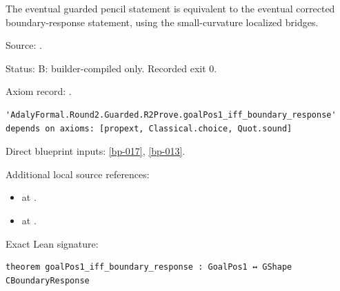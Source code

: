 \begin{theorem}[bp-020]
\label{bp-020}
\leanok
The eventual guarded pencil statement is equivalent to the eventual corrected boundary-response statement, using the small-curvature localized bridges.

\par Source: \texttt{}.
\par Status: B: builder-compiled only. Recorded exit 0.
\par Axiom record: \texttt{}.
\begin{verbatim}
'AdalyFormal.Round2.Guarded.R2Prove.goalPos1_iff_boundary_response' depends on axioms: [propext, Classical.choice, Quot.sound]
\end{verbatim}
\par Direct blueprint inputs: \ref{bp-017}, \ref{bp-013}.
\par Additional local source references:
\begin{itemize}
\item \texttt{} at \texttt{}.
\item \texttt{} at \texttt{}.
\end{itemize}
\par Exact Lean signature:
\begin{verbatim}
theorem goalPos1_iff_boundary_response : GoalPos1 ↔ GShape CBoundaryResponse
\end{verbatim}
\end{theorem}

